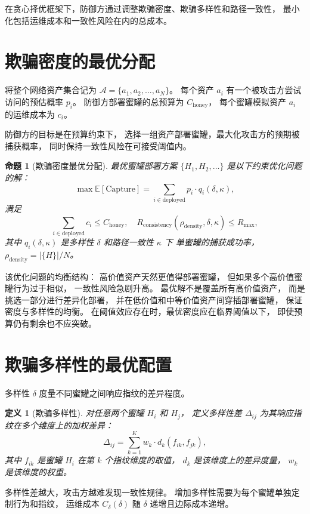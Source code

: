 \documentclass[11pt,a4paper]{article}
\newtheorem{definition}{定义}[section]
\newtheorem{proposition}{命题}[section]
\begin{document}
在贪心择优框架下，防御方通过调整欺骗密度、欺骗多样性和路径一致性，
最小化包括运维成本和一致性风险在内的总成本。

\section{欺骗密度的最优分配}

将整个网络资产集合记为 \(\mathcal{A} = \{a_1, a_2, \dots, a_N\}\)。
每个资产 \(a_i\) 有一个被攻击方尝试访问的预估概率 \(p_i\)。
防御方部署蜜罐的总预算为 \(C_{\text{honey}}\)，
每个蜜罐模拟资产 \(a_i\) 的运维成本为 \(c_i\)。

防御方的目标是在预算约束下，
选择一组资产部署蜜罐，最大化攻击方的预期被捕获概率，
同时保持一致性风险在可接受阈值内。

\begin{proposition}[欺骗密度最优分配]
最优蜜罐部署方案 \(\{H_1, H_2, \dots\}\) 是以下约束优化问题的解：
\[
\max \mathbb{E}[\text{Capture}] = \sum_{i \in \text{deployed}} p_i \cdot q_i(\delta, \kappa),
\]
满足
\[
\sum_{i \in \text{deployed}} c_i \le C_{\text{honey}},
\quad R_{\text{consistency}}(\rho_{\text{density}}, \delta, \kappa) \le R_{\max},
\]
其中 \(q_i(\delta, \kappa)\) 是多样性 \(\delta\) 和路径一致性 \(\kappa\) 下
单蜜罐的捕获成功率，
\(\rho_{\text{density}} = |\{H\}| / N\)。
\end{proposition}

该优化问题的均衡结构：
高价值资产天然更值得部署蜜罐，
但如果多个高价值蜜罐行为过于相似，
一致性风险急剧升高。
最优解不是覆盖所有高价值资产，
而是挑选一部分进行差异化部署，
并在低价值和中等价值资产间穿插部署蜜罐，
保证密度与多样性的均衡。
在阈值效应存在时，最优密度应在临界阈值以下，
即使预算仍有剩余也不应突破。

\section{欺骗多样性的最优配置}

多样性 \(\delta\) 度量不同蜜罐之间响应指纹的差异程度。

\begin{definition}[欺骗多样性]
对任意两个蜜罐 \(H_i\) 和 \(H_j\)，
定义多样性差 \(\Delta_{ij}\) 为其响应指纹在多个维度上的加权差异：
\[
\Delta_{ij} = \sum_{k=1}^{K} w_k \cdot d_k(f_{ik}, f_{jk}),
\]
其中 \(f_{ik}\) 是蜜罐 \(H_i\) 在第 \(k\) 个指纹维度的取值，
\(d_k\) 是该维度上的差异度量，
\(w_k\) 是该维度的权重。
\end{definition}

多样性差越大，攻击方越难发现一致性规律。
增加多样性需要为每个蜜罐单独定制行为和指纹，
运维成本 \(C_{\delta}(\delta)\) 随 \(\delta\) 递增且边际成本递增。
\end{document}
